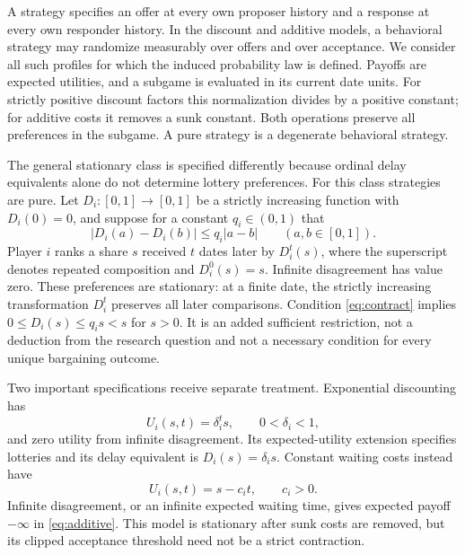 \documentclass[11pt]{article}
\begin{document}
A strategy specifies an offer at every own proposer history and a response at every own responder history. In the discount and additive models, a behavioral strategy may randomize measurably over offers and over acceptance. We consider all such profiles for which the induced probability law is defined. Payoffs are expected utilities, and a subgame is evaluated in its current date units. For strictly positive discount factors this normalization divides by a positive constant; for additive costs it removes a sunk constant. Both operations preserve all preferences in the subgame. A pure strategy is a degenerate behavioral strategy.

The general stationary class is specified differently because ordinal delay equivalents alone do not determine lottery preferences. For this class strategies are pure. Let $D_i:[0,1]\to[0,1]$ be a strictly increasing function with $D_i(0)=0$, and suppose for a constant $q_i\in(0,1)$ that
\begin{equation}\label{eq:contract}
 |D_i(a)-D_i(b)|\le q_i|a-b|\qquad(a,b\in[0,1]).
\end{equation}
Player $i$ ranks a share $s$ received $t$ dates later by $D_i^t(s)$, where the superscript denotes repeated composition and $D_i^0(s)=s$. Infinite disagreement has value zero. These preferences are stationary: at a finite date, the strictly increasing transformation $D_i^t$ preserves all later comparisons. Condition \eqref{eq:contract} implies $0\le D_i(s)\le q_i s<s$ for $s>0$. It is an added sufficient restriction, not a deduction from the research question and not a necessary condition for every unique bargaining outcome.

Two important specifications receive separate treatment. Exponential discounting has
\begin{equation}\label{eq:discount}
 U_i(s,t)=\delta_i^t s,\qquad 0<\delta_i<1,
\end{equation}
and zero utility from infinite disagreement. Its expected-utility extension specifies lotteries and its delay equivalent is $D_i(s)=\delta_i s$. Constant waiting costs instead have
\begin{equation}\label{eq:additive}
 U_i(s,t)=s-c_i t,\qquad c_i>0.
\end{equation}
Infinite disagreement, or an infinite expected waiting time, gives expected payoff $-\infty$ in \eqref{eq:additive}. This model is stationary after sunk costs are removed, but its clipped acceptance threshold need not be a strict contraction.
\end{document}
